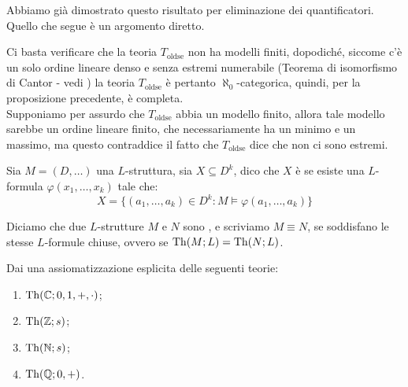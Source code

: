 \begin{note}
    Abbiamo già dimostrato questo risultato per eliminazione dei quantificatori. Quello che segue è un argomento diretto.
\end{note}

\begin{soln}
    Ci basta verificare che la teoria $T_{\text{oldse}}$ non ha modelli finiti, dopodiché,
    siccome c'è un solo ordine lineare denso e senza estremi numerabile (Teorema di isomorfismo di Cantor - vedi \href{https://ciovil.li/eti25/dispense-eti.pdf}{})
    la teoria $T_{\text{oldse}}$ è pertanto $\aleph_0$-categorica, quindi, per la proposizione precedente, è completa.\\
    Supponiamo per assurdo che $T_{\text{oldse}}$ abbia un modello finito, allora tale modello sarebbe un ordine lineare finito, che necessariamente ha un minimo e un massimo, ma questo contraddice il fatto che $T_{\text{oldse}}$ dice che non ci sono estremi.
\end{soln}

\begin{definition}
    Sia $M = (D,\ldots)$ una $L$-struttura, sia $X \subseteq D^k$, dico che $X$ è  se esiste una $L$-formula $\varphi(x_1,\ldots,x_k)$ tale che:
    \[ X = \{(a_1,\ldots,a_k) \in D^k : M \models \varphi(a_1,\ldots,a_k)\}
    \]
\end{definition}

\begin{definition}
    Diciamo che due $L$-strutture $M$ e $N$ sono , e scriviamo $M \equiv N$, se soddisfano le stesse $L$-formule chiuse, ovvero se $\operatorname{Th}(M;L) = \operatorname{Th}(N;L)$.
\end{definition}

\begin{exercise}
    Dai una assiomatizzazione esplicita delle seguenti teorie:
    \begin{enumerate}
        \item $\operatorname{Th}(\mathbb C;0,1,+,\cdot)$;
        \item $\operatorname{Th}(\mathbb Z;s)$;
        \item $\operatorname{Th}(\mathbb N;s)$;
        \item $\operatorname{Th}(\mathbb Q;0,+)$.
    \end{enumerate}
\end{exercise}

